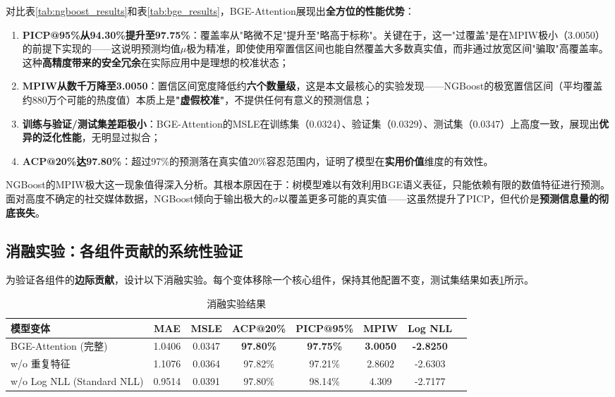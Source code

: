 \documentclass[10pt]{article}
\begin{document}
对比表\ref{tab:ngboost_results}和表\ref{tab:bge_results}，BGE-Attention展现出\textbf{全方位的性能优势}：

\begin{enumerate}[leftmargin=*]
    \item \textbf{PICP@95\%从94.30\%提升至97.75\%}：覆盖率从"略微不足"提升至"略高于标称"。关键在于，这一"过覆盖"是在MPIW极小（3.0050）的前提下实现的——这说明预测均值$\mu$极为精准，即使使用窄置信区间也能自然覆盖大多数真实值，而非通过放宽区间"骗取"高覆盖率。这种\textbf{高精度带来的安全冗余}在实际应用中是理想的校准状态；
    \item \textbf{MPIW从数千万降至3.0050}：置信区间宽度降低约\textbf{六个数量级}，这是本文最核心的实验发现——NGBoost的极宽置信区间（平均覆盖约880万个可能的热度值）本质上是\textbf{"虚假校准"}，不提供任何有意义的预测信息；
    \item \textbf{训练与验证/测试集差距极小}：BGE-Attention的MSLE在训练集（0.0324）、验证集（0.0329）、测试集（0.0347）上高度一致，展现出\textbf{优异的泛化性能}，无明显过拟合；
    \item \textbf{ACP@20\%达97.80\%}：超过97\%的预测落在真实值20\%容忍范围内，证明了模型在\textbf{实用价值}维度的有效性。
\end{enumerate}

NGBoost的MPIW极大这一现象值得深入分析。其根本原因在于：树模型难以有效利用BGE语义表征，只能依赖有限的数值特征进行预测。面对高度不确定的社交媒体数据，NGBoost倾向于输出极大的$\sigma$以覆盖更多可能的真实值——这虽然提升了PICP，但代价是\textbf{预测信息量的彻底丧失}。

\subsection{消融实验：各组件贡献的系统性验证}

为验证各组件的\textbf{边际贡献}，设计以下消融实验。每个变体移除一个核心组件，保持其他配置不变，测试集结果如表\ref{tab:ablation}所示。

\begin{table}[H]
\centering
\caption{消融实验结果}
\label{tab:ablation}
\begin{tabular}{lccccccc}
\toprule
\textbf{模型变体} & \textbf{MAE} & \textbf{MSLE} & \textbf{ACP@20\%} & \textbf{PICP@95\%} & \textbf{MPIW} & \textbf{Log NLL} \\
\midrule
BGE-Attention (完整) & 1.0406 & 0.0347 & \textbf{97.80\%} & \textbf{97.75\%} & \textbf{3.0050} & \textbf{-2.8250} \\
w/o 重复特征 & 1.1076 & 0.0364 & 97.82\% & 97.21\% & 2.8602 & -2.6303 \\
w/o Log NLL (Standard NLL) & 0.9514 & 0.0391 & 97.80\% & 98.14\% & 4.309 & -2.7177 \\
\bottomrule
\end{tabular}
\end{table}
\end{document}
